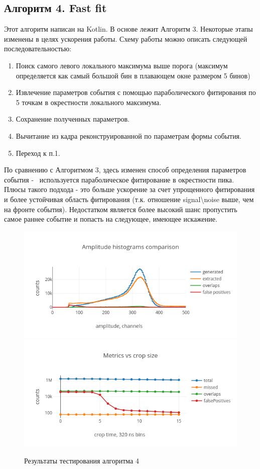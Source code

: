 \documentclass[a4paper,14pt]{extreport}
\begin{document}
\subsection{Алгоритм 4. Fast fit}
Этот алгоритм написан на Kotlin. В основе лежит Алгоритм 3. Некоторые этапы изменены в целях ускорения работы. Схему работы можно описать следующей последовательностью:

\begin{enumerate}
    \item Поиск самого левого локального максимума выше порога (максимум определяется как самый большой бин в плавающем окне размером 5 бинов)
    \item Извлечение параметров события с помощью параболического фитирования по 5 точкам в окрестности локального максимума.
    \item Сохранение полученных параметров.
    \item Вычитание из кадра реконструированной по параметрам формы события.
    \item Переход к п.1.
\end{enumerate}

По сравнению с Алгоритмом 3, здесь изменен способ определения параметров события - ~используется параболическое фитирование в окрестности пика. Плюсы такого подхода - это больше ускорение за счет упрощенного фитирования и более устойчивая область фитирования (т.к. отношение signal\textbackslash noise выше, чем на фронте события). Недостатком является более высокий шанс пропустить самое раннее событие и попасть на следующее, имеющее искажение.

\begin{figure}
\centering
	\includegraphics[width=0.80\linewidth]{img/signals/method_4/hists.png} \\
    \includegraphics[width=0.80\linewidth]{img/signals/method_4/crop.png}
    \caption{Результаты тестирования алгоритма 4}
    \label{method-4-metrics}
\end{figure}
\end{document}
